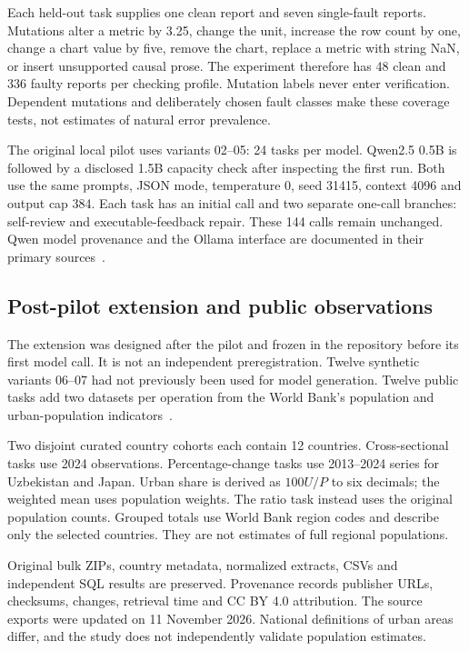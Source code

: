 Each held-out task supplies one clean report and seven single-fault reports. Mutations alter a metric by 3.25, change the unit, increase the row count by one, change a chart value by five, remove the chart, replace a metric with string NaN, or insert unsupported causal prose. The experiment therefore has 48 clean and 336 faulty reports per checking profile. Mutation labels never enter verification. Dependent mutations and deliberately chosen fault classes make these coverage tests, not estimates of natural error prevalence.

The original local pilot uses variants 02--05: 24 tasks per model. Qwen2.5 0.5B is followed by a disclosed 1.5B capacity check after inspecting the first run. Both use the same prompts, JSON mode, temperature 0, seed 31415, context 4096 and output cap 384. Each task has an initial call and two separate one-call branches: self-review and executable-feedback repair. These 144 calls remain unchanged. Qwen model provenance and the Ollama interface are documented in their primary sources~\cite{qwen2024,ollama2026}.

\subsection{Post-pilot extension and public observations}
The extension was designed after the pilot and frozen in the repository before its first model call. It is not an independent preregistration. Twelve synthetic variants 06--07 had not previously been used for model generation. Twelve public tasks add two datasets per operation from the World Bank's population and urban-population indicators~\cite{worldbank2026population,worldbank2026urban}.

Two disjoint curated country cohorts each contain 12 countries. Cross-sectional tasks use 2024 observations. Percentage-change tasks use 2013--2024 series for Uzbekistan and Japan. Urban share is derived as $100U/P$ to six decimals; the weighted mean uses population weights. The ratio task instead uses the original population counts. Grouped totals use World Bank region codes and describe only the selected countries. They are not estimates of full regional populations.

Original bulk ZIPs, country metadata, normalized extracts, CSVs and independent SQL results are preserved. Provenance records publisher URLs, checksums, changes, retrieval time and CC BY 4.0 attribution. The source exports were updated on 11 November 2026. National definitions of urban areas differ, and the study does not independently validate population estimates.

